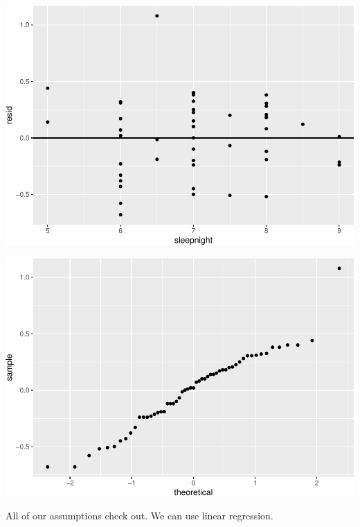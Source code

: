\documentclass[]{article}
\newenvironment{Shaded}{\begin{snugshade}}{\end{snugshade}}
\newcommand{\DataTypeTok}[1]{\textcolor[rgb]{0.13,0.29,0.53}{#1}}
\newcommand{\DecValTok}[1]{\textcolor[rgb]{0.00,0.00,0.81}{#1}}
\newcommand{\KeywordTok}[1]{\textcolor[rgb]{0.13,0.29,0.53}{\textbf{#1}}}
\newcommand{\NormalTok}[1]{#1}
\newcommand{\OperatorTok}[1]{\textcolor[rgb]{0.81,0.36,0.00}{\textbf{#1}}}
\newcommand{\StringTok}[1]{\textcolor[rgb]{0.31,0.60,0.02}{#1}}
\begin{document}
\includegraphics{lab-8-regression_files/figure-latex/unnamed-chunk-8-1.pdf}

\begin{Shaded}
\end{Shaded}

\includegraphics{lab-8-regression_files/figure-latex/unnamed-chunk-9-1.pdf}

All of our assumptions check out. We can use linear regression.
\end{document}
